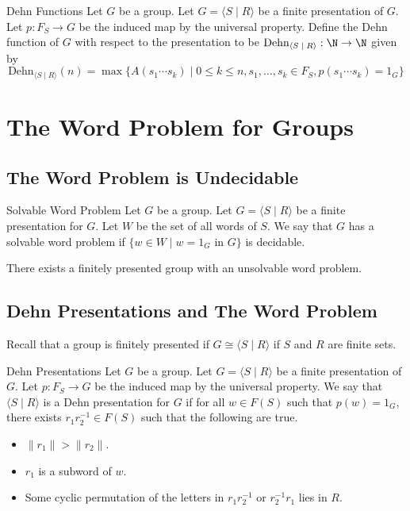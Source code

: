 \documentclass[a4paper]{article}
\begin{document}
\begin{defn}{Dehn Functions}{} Let $G$ be a group. Let $G=\langle S\;|\;R\rangle$ be a finite presentation of $G$. Let $p:F_S\to G$ be the induced map by the universal property. Define the Dehn function of $G$ with respect to the presentation to be $\text{Dehn}_{\langle S\;|\;R\rangle}:\N\to\N$ given by $$\text{Dehn}_{\langle S\;|\;R\rangle}(n)=\max\{A(s_1\cdots s_k)\;|\;0\leq k\leq n, s_1,\dots,s_k\in F_S, p(s_1\cdots s_k)=1_G\}$$
\end{defn}

\pagebreak
\section{The Word Problem for Groups}
\subsection{The Word Problem is Undecidable}
\begin{defn}{Solvable Word Problem}{} Let $G$ be a group. Let $G=\langle S\;|\;R\rangle$ be a finite presentation for $G$. Let $W$ be the set of all words of $S$. We say that $G$ has a solvable word problem if $\{w\in W\;|\;w=1_G\text{ in }G\}$ is decidable. 
\end{defn}

\begin{thm}{}{} There exists a finitely presented group with an unsolvable word problem. 
\end{thm}

\subsection{Dehn Presentations and The Word Problem}
Recall that a group is finitely presented if $G\cong\langle S\;|\;R\rangle$ if $S$ and $R$ are finite sets. 

\begin{defn}{Dehn Presentations}{} Let $G$ be a group. Let $G=\langle S\;|\;R\rangle$ be a finite presentation of $G$. Let $p:F_S\to G$ be the induced map by the universal property. We say that $\langle S\;|\;R\rangle$ is a Dehn presentation for $G$ if for all $w\in F(S)$ such that $p(w)=1_G$, there exists $r_1r_2^{-1}\in F(S)$ such that the following are true. 
\begin{itemize}
\item $\|r_1\|>\|r_2\|$. 
\item $r_1$ is a subword of $w$. 
\item Some cyclic permutation of the letters in $r_1r_2^{-1}$ or $r_2^{-1}r_1$ lies in $R$. 
\end{itemize}
\end{defn}
\end{document}

